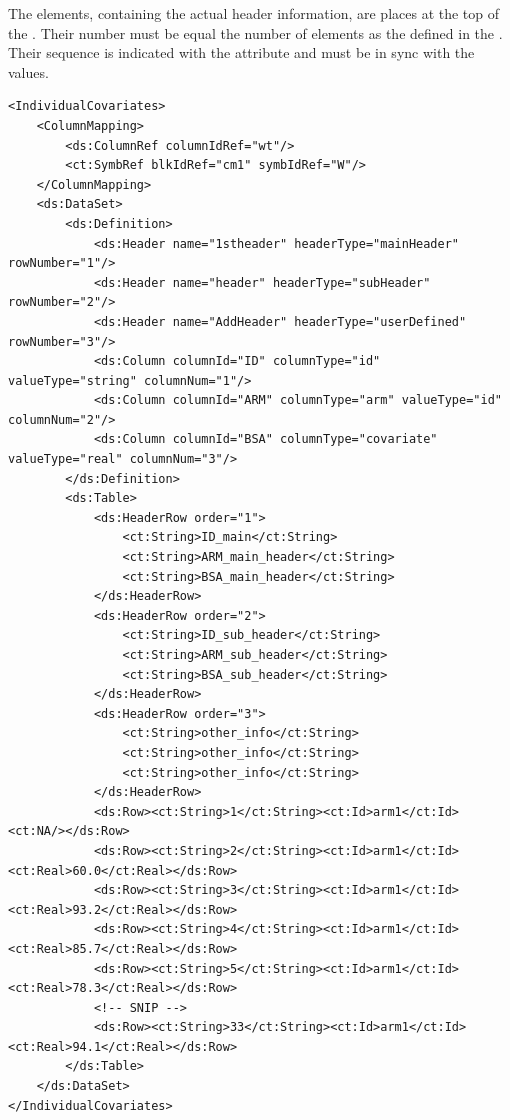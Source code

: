 The  elements, containing the actual header information, are places
at the top of the . Their number must be equal the number of
 elements as the defined in the . Their sequence is 
indicated with the  attribute and must be in sync with the 
values.
\lstset{language=XML}
\begin{lstlisting}
<IndividualCovariates>
    <ColumnMapping>
        <ds:ColumnRef columnIdRef="wt"/>
        <ct:SymbRef blkIdRef="cm1" symbIdRef="W"/>
    </ColumnMapping>
    <ds:DataSet>
        <ds:Definition>
            <ds:Header name="1stheader" headerType="mainHeader" rowNumber="1"/>
            <ds:Header name="header" headerType="subHeader" rowNumber="2"/>
            <ds:Header name="AddHeader" headerType="userDefined" rowNumber="3"/>
            <ds:Column columnId="ID" columnType="id" valueType="string" columnNum="1"/>
            <ds:Column columnId="ARM" columnType="arm" valueType="id" columnNum="2"/>
            <ds:Column columnId="BSA" columnType="covariate" valueType="real" columnNum="3"/>
        </ds:Definition>
        <ds:Table>
            <ds:HeaderRow order="1">
                <ct:String>ID_main</ct:String>
                <ct:String>ARM_main_header</ct:String>
                <ct:String>BSA_main_header</ct:String>
            </ds:HeaderRow>
            <ds:HeaderRow order="2">
                <ct:String>ID_sub_header</ct:String>
                <ct:String>ARM_sub_header</ct:String>
                <ct:String>BSA_sub_header</ct:String>
            </ds:HeaderRow>
            <ds:HeaderRow order="3">
                <ct:String>other_info</ct:String>
                <ct:String>other_info</ct:String>
                <ct:String>other_info</ct:String>
            </ds:HeaderRow>
            <ds:Row><ct:String>1</ct:String><ct:Id>arm1</ct:Id><ct:NA/></ds:Row>
            <ds:Row><ct:String>2</ct:String><ct:Id>arm1</ct:Id><ct:Real>60.0</ct:Real></ds:Row>
            <ds:Row><ct:String>3</ct:String><ct:Id>arm1</ct:Id><ct:Real>93.2</ct:Real></ds:Row>
            <ds:Row><ct:String>4</ct:String><ct:Id>arm1</ct:Id><ct:Real>85.7</ct:Real></ds:Row>
            <ds:Row><ct:String>5</ct:String><ct:Id>arm1</ct:Id><ct:Real>78.3</ct:Real></ds:Row>
            <!-- SNIP -->
            <ds:Row><ct:String>33</ct:String><ct:Id>arm1</ct:Id><ct:Real>94.1</ct:Real></ds:Row>
        </ds:Table>
    </ds:DataSet>
</IndividualCovariates>
\end{lstlisting}


